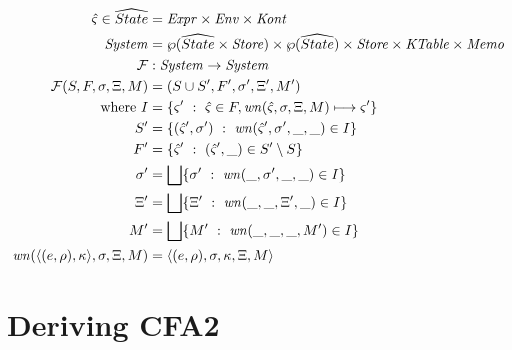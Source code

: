 \documentclass{llncs}
\begin{document}
\begin{align*}
  \hat\varsigma \in \widehat{State} &= \mathit{Expr} \times \mathit{Env} \times \mathit{Kont} \\
  \mathit{System} &= \wp(\widehat{State} \times \mathit{Store}) \times \wp(\widehat{State}) \times \mathit{Store} \times \mathit{KTable} \times \mathit{Memo} \\
  {\mathcal F} &: \mathit{System} \to \mathit{System} \\
  {\mathcal F}(S, F, \sigma, \Xi, M) &= (S \cup S', F', \sigma', \Xi', M') \\
  \text{where } I &= \{ \varsigma'\ :\ \hat\varsigma \in F, \mathit{wn}(\hat\varsigma,\sigma,\Xi,M) \longmapsto \varsigma'\} \\
                S' &= \{ (\hat\varsigma',\sigma')\ :\ \mathit{wn}(\hat\varsigma', \sigma', \_, \_) \in I\} \\
                F' &= \{ \hat\varsigma'\ :\ (\hat\varsigma',\_) \in S' \setminus S\} \\
                \sigma' &= \bigsqcup\{ \sigma'\ :\ \mathit{wn}(\_, \sigma',\_,\_) \in I\} \\
                \Xi' &=  \bigsqcup\{ \Xi'\ :\ \mathit{wn}(\_, \_, \Xi', \_) \in I\} \\
                M' &=  \bigsqcup\{ M'\ :\ \mathit{wn}(\_, \_, \_, M') \in I\} \\
                \mathit{wn}(\langle (e,\rho),\kappa \rangle,\sigma,\Xi,M) &= \langle (e,\rho),\sigma,\kappa,\Xi,M \rangle
\end{align*}

\section{Deriving CFA2}
\label{sec:cfa2}
\end{document}

